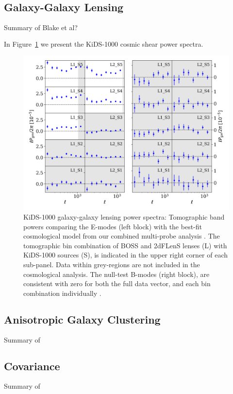 \subsection{Galaxy-Galaxy Lensing}
\label{sec:GGL}
Summary of Blake et al?


In Figure~\ref{fig:Pgk} we present the KiDS-1000 cosmic shear power spectra.

\begin{figure}
        \includegraphics[width=\textwidth]{Data_Plots/Pgk/Pgk_K1000_2Dbins_v2_goldclasses_Flag_SOM_Fid.png}
        \caption{KiDS-1000 galaxy-galaxy lensing power spectra:
          Tomographic band powers comparing the E-modes (left block)
          with the best-fit
          cosmological model from our combined multi-probe analysis
          .  The tomographic 
        bin combination of BOSS and 2dFLenS lenses (L) with KiDS-1000
        sources (S), is indicated in the upper right corner of each
        sub-panel.  Data within grey-regions are not included in the cosmological analysis.
        The null-test B-modes (right block), are
      consistent with zero for both the full data vector, and each
     bin combination individually .}
        \label{fig:Pgk}
\end{figure}

\subsection{Anisotropic Galaxy Clustering}
\label{sec:clustering}
Summary of \citet{sanchez/etal:2017}

\subsection{Covariance}
\label{sec:Cov}
Summary of \citet{joachimi/etal:inprep}

